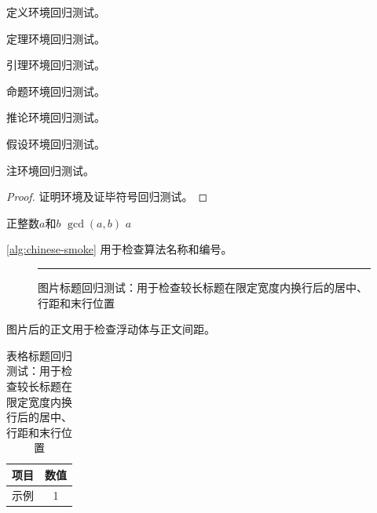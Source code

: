 \documentclass[tocdepth3]{uestcthesis}
\begin{document}
\begin{definition}定义环境回归测试。\end{definition}
\begin{theorem}定理环境回归测试。\end{theorem}
\begin{lemma}引理环境回归测试。\end{lemma}
\begin{proposition}命题环境回归测试。\end{proposition}
\begin{corollary}推论环境回归测试。\end{corollary}
\begin{assumption}假设环境回归测试。\end{assumption}
\begin{remark}注环境回归测试。\end{remark}
\begin{proof}证明环境及证毕符号回归测试。\end{proof}

\begin{algorithm}[htbp]
    \caption{算法环境回归测试}
    \label{alg:chinese-smoke}
    \begin{algorithmic}[1]
        \Require 正整数$a$和$b$
        \Ensure $\gcd(a,b)$
        \State \Return $a$
    \end{algorithmic}
\end{algorithm}
\autoref{alg:chinese-smoke} 用于检查算法名称和编号。

\begin{figure}[htbp]
    \centering
    \rule{8cm}{3cm}
    \caption{图片标题回归测试：用于检查较长标题在限定宽度内换行后的居中、行距和末行位置}
\end{figure}

图片后的正文用于检查浮动体与正文间距。

\clearpage

\begin{table}[htbp]
    \centering
    \caption{表格标题回归测试：用于检查较长标题在限定宽度内换行后的居中、行距和末行位置}
    \begin{tabular}{lc}
        \toprule
        项目 & 数值 \\
        \midrule
        示例 & 1 \\
        \bottomrule
    \end{tabular}
\end{table}
\end{document}
